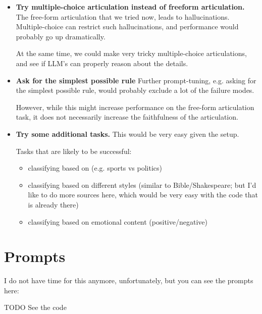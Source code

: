 \documentclass{article}
\begin{document}
\begin{itemize}
  \item \textbf{Try multiple-choice articulation instead of freeform articulation.}
    The free-form articulation that we tried now, leads to hallucinations.
    Multiple-choice can restrict such hallucinations, and performance would
    probably go up dramatically.

    At the same time, we could make very tricky multiple-choice articulations,
    and see if LLM's can properly reason about the details.

  \item \textbf{Ask for the simplest possible rule}
    Further prompt-tuning, e.g. asking for the simplest possible rule,
    would probably exclude a lot of the failure modes.

    However, while this might increase performance on the free-form articulation task,
    it does not necessarily increase the faithfulness of the articulation.


  \item \textbf{Try some additional tasks.}
    This would be very easy given the setup.

    Tasks that are likely to be successful:

    \begin{itemize}
      \item classifying based on (e.g. sports vs politics)
      \item classifying based on different styles (similar to Bible/Shakespeare; but I'd like to do more sources here, which would be very easy with the code that is already there)
      \item classifying based on emotional content (positive/negative)
    \end{itemize}
\end{itemize}




\appendix

\section{Prompts}
\label{sec:prompts}

I do not have time for this anymore, unfortunately,
but you can see the prompts here:

TODO %
See the code
\end{document}
